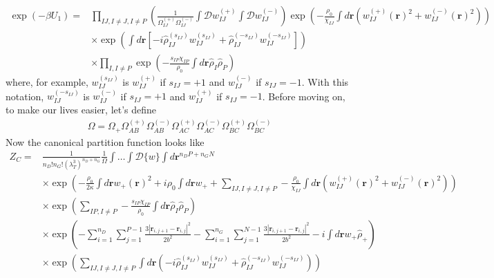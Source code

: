 \documentclass{article}
\begin{document}
\begin{align*}
  \exp (-\beta U_1) =&
    \prod_{IJ, I \ne J, I \ne P} \left(
      \frac{1}{\Omega_{IJ}^{(+)}\Omega_{IJ}^{(-)}}
      \int \mathcal{D} w_{IJ}^{(+)} \int \mathcal{D} w_{IJ}^{(-)}
    \right)
    \exp \left(
      -\frac{\rho_0}{\chi_{IJ}}
      \int d \mathbf{r} \left( 
        w_{IJ}^{(+)}(\mathbf{r})^2 + w_{IJ}^{(-)}(\mathbf{r})^2
      \right)
    \right) \\
    &\times
    \exp \left(
      \int d \mathbf{r} \left[ 
        - i \hat{\rho}_{IJ}^{(s_{IJ})} w_{IJ}^{(s_{IJ})}
        + \hat{\rho}_{IJ}^{(-s_{IJ})} w_{IJ}^{(-s_{IJ})}
      \right]
    \right) \\
    &\times
    \prod_{I, I \ne P} \exp \left(
      - \frac{s_{IP}\chi_{IP}}{\rho_0}
      \int d \mathbf{r} \hat{\rho}_I \hat{\rho}_P
    \right)
\end{align*}
where, for example, $w_{IJ}^{(s_{IJ})}$ is $w_{IJ}^{(+)}$ if $s_{IJ} = +1$ and
  $w_{IJ}^{(-)}$ if $s_{IJ} = -1$.
With this notation, $w_{IJ}^{(-s_{IJ})}$ is $w_{IJ}^{(-)}$ if $s_{IJ} = +1$ and
  $w_{IJ}^{(+)}$ if $s_{IJ} = -1$.
Before moving on, to make our lives easier, let's define
\begin{align*}
  \Omega =
    \Omega_+
    \Omega_{AB}^{(+)} \Omega_{AB}^{(-)}
    \Omega_{AC}^{(+)} \Omega_{AC}^{(-)}
    \Omega_{BC}^{(+)} \Omega_{BC}^{(-)}
\end{align*}
Now the canonical partition function looks like
\begin{align*}
  Z_C =& \frac{1}{n_D!n_G! \left( \lambda_T^3 \right)^{n_D+n_G}}
    \frac{1}{\Omega}
    \int \hdots \int \mathcal{D} \{w\}
    \int d \mathbf{r}^{n_D P + n_G N} \\
    &\times
    \exp \left(
      - \frac{\rho_0}{2\kappa} \int d \mathbf{r} w_+(\mathbf{r})^2
      + i \rho_0 \int d\mathbf{r} w_+
      + \sum_{IJ,I \ne J, I \ne P}
      - \frac{\rho_0}{\chi_{IJ}}
      \int d \mathbf{r}
      \left(
        w_{IJ}^{(+)} (\mathbf{r})^2 + w_{IJ}^{(-)} (\mathbf{r})^2
      \right)
    \right) \\
    &\times
    \exp \left(
      \sum_{IP,I \ne P}
      - \frac{s_{IP}\chi_{IP}}{\rho_0}
      \int d \mathbf{r} \hat{\rho}_I \hat{\rho}_P
    \right) \\
    &\times
    \exp \left(
      - \sum_{i=1}^{n_D} \sum_{j=1}^{P-1}
      \frac{3 \left| \mathbf{r}_{i,j+1} - \mathbf{r}_{i,j} \right| ^ 2 }
           { 2 b^2 }
      - \sum_{i=1}^{n_G} \sum_{j=1}^{N-1}
      \frac{3 \left| \mathbf{r}_{i,j+1} - \mathbf{r}_{i,j} \right| ^ 2 }
           { 2 b^2 }
      - i\int d \mathbf{r} w_+ \hat{\rho}_+
    \right) \\
    &\times
    \exp \left(
      \sum_{IJ, I \ne J, I \ne P}
      \int d \mathbf{r} \left(
        -i \hat{\rho}_{IJ}^{(s_{IJ})} w_{IJ}^{(s_{IJ})}
        + \hat{\rho}_{IJ}^{(-s_{IJ})} w_{IJ}^{(-s_{IJ})}
      \right)
    \right)
\end{align*}
\end{document}
